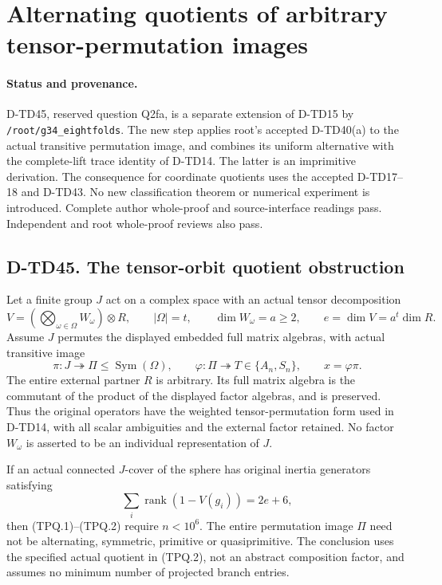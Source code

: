 \section{Alternating quotients of arbitrary tensor-permutation images}
\label{sec:tensor-permutation-alternating-quotient}

\paragraph{Status and provenance.}
D-TD45, reserved question Q2fa, is a separate extension of D-TD15
by \texttt{/root/g34\_eightfolds}. The new step applies root's
accepted D-TD40(a) to the actual transitive permutation image,
and combines its uniform alternative with the complete-lift trace
identity of D-TD14. The latter is an imprimitive derivation.
The consequence for coordinate quotients uses the accepted D-TD17--18
and D-TD43. No new classification theorem or numerical experiment
is introduced. Complete author whole-proof and source-interface
readings pass. Independent and root whole-proof reviews also pass.

\subsection*{D-TD45. The tensor-orbit quotient obstruction}

Let a finite group $J$ act on a complex space with an actual tensor
decomposition
\[
 V=\left(\bigotimes_{\omega\in\Omega}W_\omega\right)\otimes R,
 \qquad |\Omega|=t,\qquad \dim W_\omega=a\ge2,
 \qquad e=\dim V=a^t\dim R.
 \tag{TPQ.1}
\]
Assume $J$ permutes the displayed embedded full matrix algebras,
with actual transitive image
\[
 \pi:J\twoheadrightarrow\Pi\le\operatorname{Sym}(\Omega),
 \qquad \varphi:\Pi\twoheadrightarrow T\in\{A_n,S_n\},
 \qquad x=\varphi\pi.
 \tag{TPQ.2}
\]
The entire external partner $R$ is arbitrary. Its full matrix algebra
is the commutant of the product of the displayed factor algebras,
and is preserved. Thus the original operators have the weighted
tensor-permutation form used in D-TD14, with all scalar ambiguities
and the external factor retained. No factor $W_\omega$ is asserted
to be an individual representation of $J$.

\begin{theorem}[D-TD45]
If an actual connected $J$-cover of the sphere has original inertia
generators satisfying
\[
              \sum_i\operatorname{rank}(1-V(g_i))=2e+6,
 \tag{TPQ.3}
\]
then (TPQ.1)--(TPQ.2) require $n<10^6$.
The entire permutation image $\Pi$ need not be alternating,
symmetric, primitive or quasiprimitive. The conclusion uses the
specified actual quotient in (TPQ.2), not an abstract composition
factor, and assumes no minimum number of projected branch entries.
\end{theorem}

